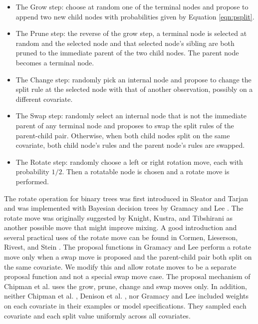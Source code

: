 \begin{itemize}
 \item The Grow step: choose at random one of the terminal nodes and propose to append two new child nodes with probabilities given by Equation \ref{eqn:psplit}. 
 \item The Prune step: the reverse of the grow step, a terminal node is selected at random and the selected node and that selected node's sibling are both pruned to the immediate parent of the two child nodes. The parent node becomes a terminal node. 
 \item The Change step: randomly pick an internal node and propose to change the split rule at the selected node with that of another observation, possibly on a different covariate.
  \item The Swap step: randomly select an internal node that is not the immediate parent of any terminal node and proposes to swap the split rules of the parent-child pair. Otherwise, when both child nodes split on the same covariate, both child node's rules and the parent node's rules are swapped.
  \item The Rotate step: randomly choose a left or right rotation move, each with probability $1/2$. Then a rotatable node is chosen and a rotate move is performed.
 \end{itemize}
  The rotate operation for binary trees was first introduced in Sleator and Tarjan \cite{sleator1985self} and was implemented with Bayesian decision trees by Gramacy and Lee \cite{gramacy2008bayesian}. The rotate move was originally suggested by Knight, Kustra, and Tibshirani \cite{knight1998bayesian} as another possible move that might improve mixing. A good introduction and several practical uses of the rotate move can be found in Cormen, Lieserson, Rivest, and Stein \cite{cormen2001introduction}. The proposal functions in Gramacy and Lee \cite{gramacy2008bayesian} perform a rotate move only when a swap move is proposed and the parent-child pair both split on the same covariate. We modify this and allow rotate moves to be a separate proposal function and not a special swap move case. The proposal mechanism of Chipman et al. uses the grow, prune, change and swap moves only. In addition, neither Chipman et al. \cite{chipman1998bayesian}, Denison et al. \cite{denison1998bayesian}, nor Gramacy and Lee \cite{gramacy2008bayesian} included weights on each covariate in their examples or model specifications. They sampled each covariate and each split value uniformly across all covariates. 
  
\newpage
